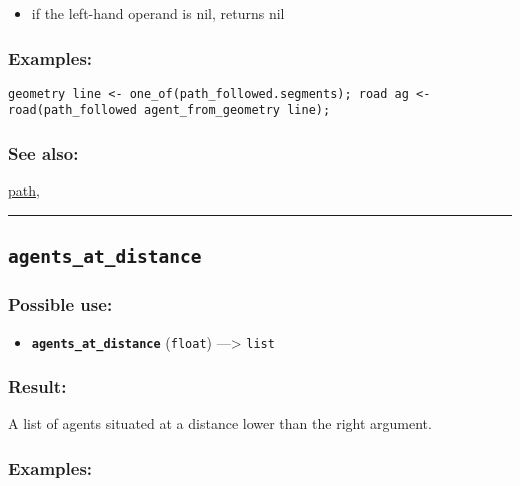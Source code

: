 \documentclass[]{book}
\providecommand{\tightlist}{%
  \setlength{\itemsep}{0pt}\setlength{\parskip}{0pt}}
\theoremstyle{definition}
\theoremstyle{definition}
\theoremstyle{definition}
\theoremstyle{remark}
\begin{document}
\begin{itemize}
\tightlist
\item
  if the left-hand operand is nil, returns nil
\end{itemize}

\subsubsection{Examples:}\label{examples-21}

\begin{verbatim}
geometry line <- one_of(path_followed.segments); road ag <- road(path_followed agent_from_geometry line); 
\end{verbatim}

\subsubsection{See also:}\label{see-also-20}

\href{operators-n-to-r.html\#path}{path},

\begin{center}\rule{0.5\linewidth}{\linethickness}\end{center}

\subsection{\texorpdfstring{\texttt{agents\_at\_distance}}{agents\_at\_distance}}\label{agents_at_distance}

\subsubsection{Possible use:}\label{possible-use-29}

\begin{itemize}
\tightlist
\item
  \textbf{\texttt{agents\_at\_distance}} (\texttt{float})
  ---\textgreater{} \texttt{list}
\end{itemize}

\subsubsection{Result:}\label{result-28}

A list of agents situated at a distance lower than the right argument.

\subsubsection{Examples:}\label{examples-22}
\end{document}

